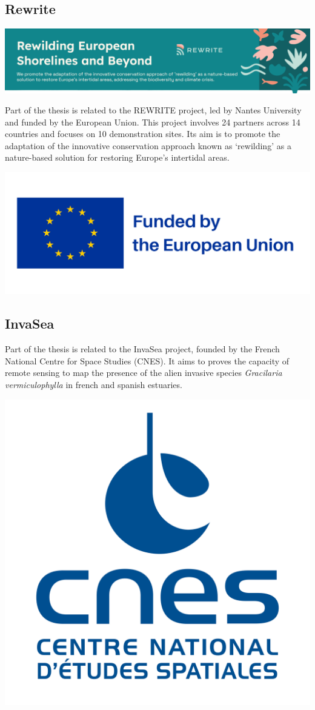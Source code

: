 \documentclass[
  letterpaper,
  11pt,
  english,
  singlespacing,
  headsepline]{MastersDoctoralThesis}
\begin{document}
\newpage

\subsection*{Rewrite}\label{rewrite}

\begin{center}
\includegraphics[width=1\linewidth,height=\textheight,keepaspectratio]{images/Rewrite_banner.png}
\end{center}

Part of the thesis is related to the REWRITE project, led by Nantes
University and funded by the European Union. This project involves 24
partners across 14 countries and focuses on 10 demonstration sites. Its
aim is to promote the adaptation of the innovative conservation approach
known as `rewilding' as a nature-based solution for restoring Europe's
intertidal areas.

\begin{center}
\includegraphics[width=0.4\linewidth,height=\textheight,keepaspectratio]{images/EU_Logo.png}
\end{center}

\subsection*{InvaSea}\label{invasea}

Part of the thesis is related to the InvaSea project, founded by the
French National Centre for Space Studies (CNES). It aims to proves the
capacity of remote sensing to map the presence of the alien invasive
species \emph{Gracilaria vermiculophylla} in french and spanish
estuaries.

\begin{center}
\includegraphics[width=0.4\linewidth,height=\textheight,keepaspectratio]{images/cnes_logo.png}
\end{center}
\end{document}
